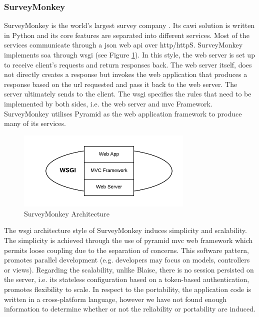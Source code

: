 	\subsubsection{SurveyMonkey}\label{sec:literature:surveyMonkey}
	SurveyMonkey is the world's largest survey company \cite{web:groom14}. Its \gls{cawi} solution is written in Python and its core features are separated into different services. Most of the services communicate through a \gls{json} web \gls{api} over \gls{http}/\gls{http}S. SurveyMonkey implements \gls{soa} through \gls{wsgi} (see Figure \ref{fig:literature:surveyMonkey}). In this style, the web server is set up to receive client's requests and return responses back. The web server itself, does not directly creates a response but invokes the web application that produces a response based on the \gls{url} requested and pass it back to the web server. The server ultimately sends to the client. The \gls{wsgi} specifies the rules that need to be implemented by both sides, i.e. the web server and \gls{mvc} Framework. SurveyMonkey utilises Pyramid as the web application framework to produce many of its services.

	\begin{figure}[h]
	\centering
	\includegraphics[width=0.75\textwidth]{literature/img/surveyMonkey.png}
	\caption{SurveyMonkey Architecture}
	\label{fig:literature:surveyMonkey}
	\end{figure}

	The \gls{wsgi} architecture style of SurveyMonkey induces simplicity and scalability. The simplicity is achieved through the use of pyramid \gls{mvc} web framework which permits loose coupling due to the separation of concerns. This software pattern, promotes parallel development (e.g. developers may focus on models, controllers or views). Regarding the scalability, unlike Blaise, there is no session persisted on the server, i.e. its stateless configuration based on a token-based authentication, promotes flexibility to scale. In respect to the portability, the application code is written in a cross-platform language, however we have not found enough information to determine whether or not the reliability or portability are induced. %


